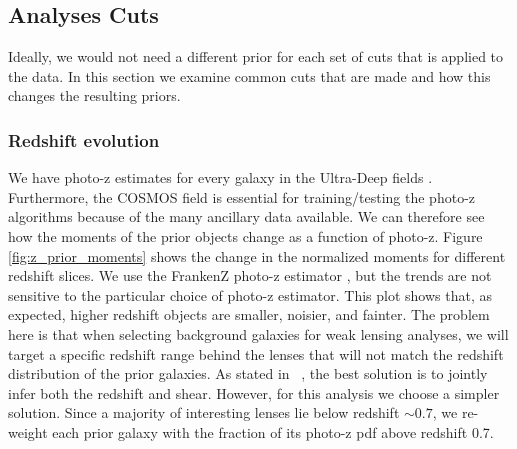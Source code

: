 \documentclass[useAMS,usenatbib]{mnras}
\begin{document}
\subsection{Analyses Cuts}
Ideally, we would not need a different prior for each set of cuts that is applied to the data.  In this section we examine common cuts that are made and how this changes the resulting priors.
\subsubsection{Redshift evolution}
We have photo-z estimates for every galaxy in the Ultra-Deep fields \citep{Photoz:inprep,Speagle:inprep}.  Furthermore, the COSMOS field is essential for training/testing the photo-z algorithms because of the many ancillary data available. We can therefore see how the moments of the prior objects change as a function of photo-z.  Figure \ref{fig:z_prior_moments} shows the change in the normalized moments for different redshift slices.  We use the FrankenZ photo-z estimator \cite{Speagle:inprep}, but the trends are not sensitive to the particular choice of photo-z estimator. This plot shows that, as expected, higher redshift objects are smaller, noisier, and fainter.  The problem here is that when selecting background galaxies for weak lensing analyses, we will target a specific redshift range behind the lenses that will not match the redshift distribution of the prior galaxies.  As stated in ~\cite{Bernstein2016}, the best solution is to jointly infer both the redshift and shear.  However, for this analysis we choose a simpler solution.  Since a majority of interesting lenses lie below redshift $\sim0.7$, we re-weight each prior galaxy with the fraction of its photo-z pdf above redshift 0.7.
\end{document}
